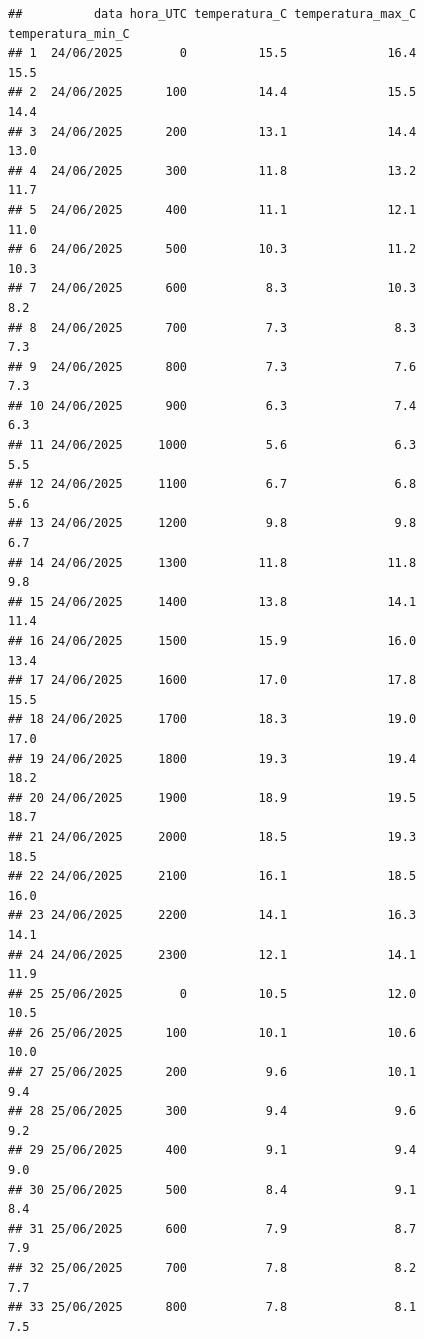 \documentclass[
]{article}
\begin{document}
\begin{verbatim}
##          data hora_UTC temperatura_C temperatura_max_C temperatura_min_C
## 1  24/06/2025        0          15.5              16.4              15.5
## 2  24/06/2025      100          14.4              15.5              14.4
## 3  24/06/2025      200          13.1              14.4              13.0
## 4  24/06/2025      300          11.8              13.2              11.7
## 5  24/06/2025      400          11.1              12.1              11.0
## 6  24/06/2025      500          10.3              11.2              10.3
## 7  24/06/2025      600           8.3              10.3               8.2
## 8  24/06/2025      700           7.3               8.3               7.3
## 9  24/06/2025      800           7.3               7.6               7.3
## 10 24/06/2025      900           6.3               7.4               6.3
## 11 24/06/2025     1000           5.6               6.3               5.5
## 12 24/06/2025     1100           6.7               6.8               5.6
## 13 24/06/2025     1200           9.8               9.8               6.7
## 14 24/06/2025     1300          11.8              11.8               9.8
## 15 24/06/2025     1400          13.8              14.1              11.4
## 16 24/06/2025     1500          15.9              16.0              13.4
## 17 24/06/2025     1600          17.0              17.8              15.5
## 18 24/06/2025     1700          18.3              19.0              17.0
## 19 24/06/2025     1800          19.3              19.4              18.2
## 20 24/06/2025     1900          18.9              19.5              18.7
## 21 24/06/2025     2000          18.5              19.3              18.5
## 22 24/06/2025     2100          16.1              18.5              16.0
## 23 24/06/2025     2200          14.1              16.3              14.1
## 24 24/06/2025     2300          12.1              14.1              11.9
## 25 25/06/2025        0          10.5              12.0              10.5
## 26 25/06/2025      100          10.1              10.6              10.0
## 27 25/06/2025      200           9.6              10.1               9.4
## 28 25/06/2025      300           9.4               9.6               9.2
## 29 25/06/2025      400           9.1               9.4               9.0
## 30 25/06/2025      500           8.4               9.1               8.4
## 31 25/06/2025      600           7.9               8.7               7.9
## 32 25/06/2025      700           7.8               8.2               7.7
## 33 25/06/2025      800           7.8               8.1               7.5

\end{verbatim}
\end{document}
